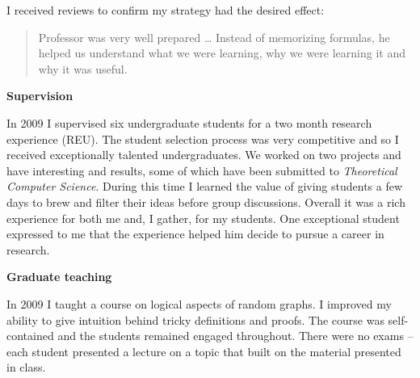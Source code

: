 \documentclass{article}
\theoremstyle{plain} \numberwithin{equation}{section}
\theoremstyle{definition}
\begin{document}
I received reviews to confirm my strategy had the desired effect:
\begin{quote}
Professor was very well prepared \dots 
Instead of memorizing formulas, he helped us understand what we were learning, why we
were learning it and why it was useful.
\end{quote}


{\bf Supervision}

In 2009 I supervised six undergraduate students for a two month research experience (REU). The student selection process was very competitive and so I received exceptionally talented undergraduates.
We worked on two projects and have interesting and results, some of which have been submitted to {\em Theoretical Computer Science}. During this time I learned the value of giving students a few days to brew and filter their ideas before group discussions.
Overall it was a rich experience for both me and, I gather, for my students. One exceptional student expressed to me that the experience helped him decide to pursue a career in research.


{\bf Graduate teaching}


In 2009 I taught a course on logical aspects of random graphs. I improved my ability to give intuition
behind tricky definitions and proofs. The course was self-contained and the students remained engaged throughout. 
There were no exams -- each student presented a lecture on a topic that built on the material presented in class.
\end{document}
